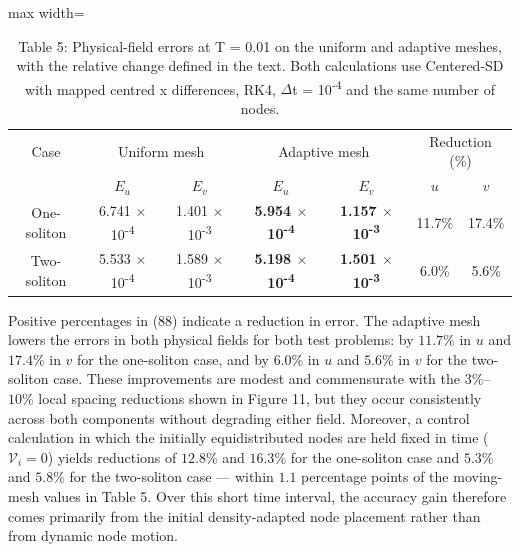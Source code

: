 \documentclass{article}
\theoremstyle{plain}
\theoremstyle{definition}
\begin{document}
\begin{table}[!htbp]
\centering
\caption*{Table 5: Physical-field errors at T = 0.01 on the uniform and adaptive meshes, with the relative change defined in the text. Both calculations use Centered-SD with mapped centred x differences, RK4, \(\Delta\)t = 10\textsuperscript{-}\textsuperscript{4} and the same number of nodes.}
\normalsize
\setlength{\tabcolsep}{6pt}
\renewcommand{\arraystretch}{1.25}\setlength{\extrarowheight}{1pt}
\setlength{\tabcolsep}{4pt}
\begin{adjustbox}{max width=\linewidth}
\begin{tabular}{ccccccc}

\hline
\multicolumn{1}{c}{Case} & \multicolumn{2}{c}{Uniform mesh} & \multicolumn{2}{c}{Adaptive mesh} & \multicolumn{2}{c}{Reduction (\%)} \\
 & \multicolumn{1}{c}{\(E_u\)} & \multicolumn{1}{c}{\(E_v\)} & \multicolumn{1}{c}{\(E_u\)} & \multicolumn{1}{c}{\(E_v\)} & \multicolumn{1}{c}{\(u\)} & \multicolumn{1}{c}{\(v\)} \\
\hline
One-soliton & 6.741 \(\times\) 10\textsuperscript{-4} & 1.401 \(\times\) 10\textsuperscript{-3} & \textbf{5.954 \(\times\) 10\textsuperscript{-4}} & \textbf{1.157 \(\times\) 10\textsuperscript{-3}} & 11.7\% & 17.4\% \\
Two-soliton & 5.533 \(\times\) 10\textsuperscript{-4} & 1.589 \(\times\) 10\textsuperscript{-3} & \textbf{5.198 \(\times\) 10\textsuperscript{-4}} & \textbf{1.501 \(\times\) 10\textsuperscript{-3}} & 6.0\% & 5.6\% \\
\hline
\end{tabular}
\end{adjustbox}
\end{table}

Positive percentages in (88) indicate a reduction in error. The adaptive mesh lowers the errors in both physical fields for both test problems: by \(11.7\%\) in \(u\) and \(17.4\%\) in \(v\) for the one-soliton case, and by \(6.0\%\) in \(u\) and \(5.6\%\) in \(v\) for the two-soliton case. These improvements are modest and commensurate with the \(3\%\)–\(10\%\) local spacing reductions shown in Figure 11, but they occur consistently across both components without degrading either field. Moreover, a control calculation in which the initially equidistributed nodes are held fixed in time (\(\mathcal V_i=0\)) yields reductions of \(12.8\%\) and \(16.3\%\) for the one-soliton case and \(5.3\%\) and \(5.8\%\) for the two-soliton case — within \(1.1\) percentage points of the moving-mesh values in Table 5. Over this short time interval, the accuracy gain therefore comes primarily from the initial density-adapted node placement rather than from dynamic node motion.
\end{document}
